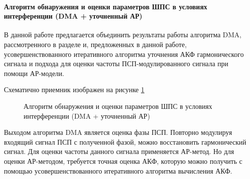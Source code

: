 \paragraph{Алгоритм обнаружения и оценки параметров ШПС в условиях интерференции (DMA + уточненный АР)}

В данной работе предлагается объединить результаты работы алгоритма DMA, рассмотренного в разделе
\cite{tsui, lin_dma} и, предложенных в данной работе, усовершенствованного итеративного 
алгоритма уточнения АКФ гармонического сигнала и подхода для оценки частоты ПСП-модулированного
сигнала при помощи АР-модели.

Схематично приемник изображен на рисунке \ref{pic:ar_dma_scheme}

\begin{figure}[H]
\center{}
	\caption{Алгоритм обнаружения и оценки параметров ШПС в условиях интерференции (DMA + уточненный АР)}
	\label{pic:ar_dma_scheme}
\end{figure}

Выходом алгоритма DMA является оценка фазы ПСП. Повторно модулируя входящий сигнал ПСП с полученной
фазой, можно восстановить гармонический сигнал. Для оценки частоты данного сигнала применяется
АР-метод. Но для оценки АР-методом, требуется точная оценка АКФ, которую можно получить
с помощью усовершенствованного итеративного алгоритма вычисления АКФ.


